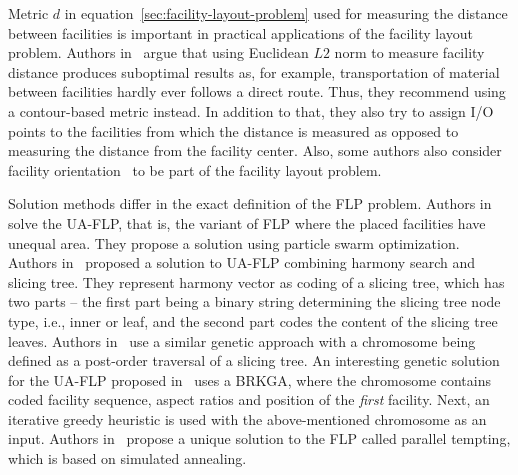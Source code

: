 Metric $d$ in equation~\ref{sec:facility-layout-problem} used for measuring the distance between facilities is important in practical applications of the facility layout problem.
Authors in~\cite{friedrichIntegratedSlicingTree2018} argue that using Euclidean $L2$ norm
to measure facility distance produces suboptimal results as, for example, transportation of material between facilities
hardly ever follows a direct route.
Thus, they recommend using a contour-based metric instead.
In addition to that, they also try to assign I/O points to the facilities from which the distance is measured as opposed to measuring the distance from the facility center.
Also, some authors also consider facility orientation~\cite{liuMultiobjectiveParticleSwarm2018, tamHierarchicalApproachFacility1991}
to be part of the facility layout problem.

Solution methods differ in the exact definition of the FLP problem.
Authors in~\cite{liuMultiobjectiveParticleSwarm2018} solve the UA-FLP, that is, the variant of FLP where the placed facilities have unequal area.
They propose a solution using particle swarm optimization.
Authors in~\cite{changSlicingTreeRepresentation2013} proposed a solution to UA-FLP combining harmony search and slicing tree.
They represent harmony vector as coding of a slicing tree, which has two parts – the first part being a binary string determining the slicing tree node type, i.e., inner or leaf,
and the second part codes the content of the slicing tree leaves.
Authors in~\cite{karyantamGeneticAlgorithmsFunction1992} use a similar genetic approach with a chromosome being defined as a post-order traversal of a slicing tree.
An interesting genetic solution for the UA-FLP proposed in~\cite{goncalvesBiasedRandomkeyGenetic2015} uses a BRKGA, where the chromosome contains coded facility sequence,
aspect ratios and position of the \textit{first} facility.
Next, an iterative greedy heuristic is used with the above-mentioned chromosome as an input.
Authors in~\cite{friedrichIntegratedSlicingTree2018} propose a unique solution to the FLP called parallel tempting, which is based on simulated annealing.
